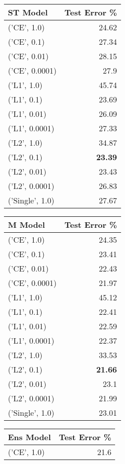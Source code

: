 \begin{tabular}{lr}
\hline
 ST Model        &   Test Error \% \\
\hline
 ('CE', 1.0)     &          24.62 \\
 ('CE', 0.1)     &          27.34 \\
 ('CE', 0.01)    &          28.15 \\
 ('CE', 0.0001)  &          27.9  \\
 ('L1', 1.0)     &          45.74 \\
 ('L1', 0.1)     &          23.69 \\
 ('L1', 0.01)    &          26.09 \\
 ('L1', 0.0001)  &          27.33 \\
 ('L2', 1.0)     &          34.87 \\
 ('L2', 0.1)     &          {\bf 23.39} \\
 ('L2', 0.01)    &          23.43 \\
 ('L2', 0.0001)  &          26.83 \\
 ('Single', 1.0) &          27.67 \\
\hline
\end{tabular}\begin{tabular}{lr}
\hline
 M Model         &   Test Error \% \\
\hline
 ('CE', 1.0)     &          24.35 \\
 ('CE', 0.1)     &          23.41 \\
 ('CE', 0.01)    &          22.43 \\
 ('CE', 0.0001)  &          21.97 \\
 ('L1', 1.0)     &          45.12 \\
 ('L1', 0.1)     &          22.41 \\
 ('L1', 0.01)    &          22.59 \\
 ('L1', 0.0001)  &          22.37 \\
 ('L2', 1.0)     &          33.53 \\
 ('L2', 0.1)     &          {\bf 21.66} \\
 ('L2', 0.01)    &          23.1  \\
 ('L2', 0.0001)  &          21.99 \\
 ('Single', 1.0) &          23.01 \\
\hline
\end{tabular}\begin{tabular}{lr}
\hline
 Ens Model       &   Test Error \% \\
\hline
 ('CE', 1.0)     &          21.6  \\

\end{tabular}
